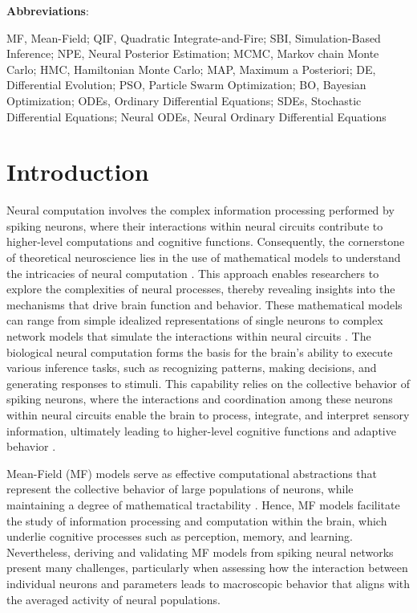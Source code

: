 \documentclass[preprint,11pt,authoryear]{elsarticle}
\begin{document}
\small
\textbf{Abbreviations}:

 MF, Mean-Field; QIF, Quadratic Integrate-and-Fire; SBI, Simulation-Based Inference;  NPE, Neural Posterior Estimation; MCMC, Markov chain Monte Carlo; HMC, Hamiltonian Monte Carlo; MAP, Maximum a Posteriori; DE, Differential Evolution; PSO, Particle Swarm Optimization; BO, Bayesian Optimization; ODEs, Ordinary Differential Equations; SDEs, Stochastic Differential Equations; Neural ODEs, Neural Ordinary Differential Equations\\



\section{Introduction}
\label{Introduction}

Neural computation involves the complex information processing performed by spiking neurons, where their interactions within neural circuits contribute to higher-level computations and cognitive functions. Consequently, the cornerstone of theoretical neuroscience lies in the use of mathematical models to understand the intricacies of neural computation \citep{Dayan2005, Hertz2018}. This approach enables researchers to explore the complexities of neural processes, thereby revealing insights into the mechanisms that drive brain function and behavior. These mathematical models can range from simple idealized representations of single neurons \citep{Hopfield1982, Izhikevich2003} to complex network models that simulate the interactions within neural circuits \citep{Marder1998, Sussillo2014, Leary2015,  Bittner2021}. 
The biological neural computation forms the basis for the brain's ability to execute various inference tasks, such as recognizing patterns, making decisions, and generating responses to stimuli. This capability relies on the collective behavior of spiking neurons, where the interactions and coordination among these neurons within neural circuits enable the brain to process, integrate, and interpret sensory information, ultimately leading to higher-level cognitive functions and adaptive behavior \citep{Kandel2000, Gerstner2014, Friston2009, Friston2017}. 


Mean-Field (MF) models serve as effective computational abstractions that represent the collective behavior of large populations of neurons, while maintaining a degree of mathematical tractability \citep{Amari1977, Wilson1973, Jirsa1996, David2003, Deco2008, Hutt2015, Coombes2018, Bandyopadhyay2021, Cook2022}. Hence,  MF models facilitate the study of information processing and computation within the brain, which underlie cognitive processes such as perception, memory, and learning. Nevertheless, deriving and validating MF models from spiking neural networks present many challenges, particularly when assessing how the interaction between individual neurons and parameters leads to macroscopic behavior that aligns with the averaged activity of neural populations.
\end{document}
